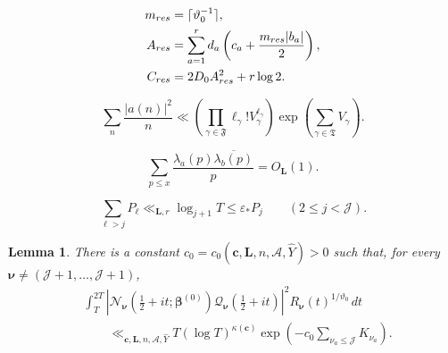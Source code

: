 \documentclass[10pt,a4paper]{amsart}
\newtheorem{lem}{Lemma}
\begin{document}
		\begin{equation}\label{residualMajorantParameters}
			\begin{split}
				m_{\rm res}&=\lceil\vartheta_0^{-1}\rceil,\\
				A_{\rm res}&=\sum_{a=1}^r d_a
				\left(c_a+\frac{m_{\rm res}|b_a|}{2}\right),\\
				C_{\rm res}&=2D_0 A_{\rm res}^2+r\log2 .
			\end{split}
		\end{equation}

			\begin{equation}\label{multiblockCoefficientBound}
				\sum_n\frac{|a(n)|^2}{n}
				\ll
				\left(\prod_{\gamma\in\mathfrak F}
				\ell_\gamma!V_\gamma^{\ell_\gamma}\right)
				\exp\left(\sum_{\gamma\in\mathfrak T}V_\gamma\right).
			\end{equation}

		\begin{equation}\label{crossBlockCovariances}
			\sum_{p\leq x}\frac{\lambda_a(p)\overline{\lambda_b(p)}}p=O_{\boldsymbol L}(1).
		\end{equation}

		\begin{equation}\label{primeBlockHierarchy}
			\sum_{\ell>j}P_\ell\ll_{\boldsymbol L,r}\log_{j+1}T
			\leq\varepsilon_*P_j\qquad(2\leq j<\mathscr J).
		\end{equation}

		\begin{lem}\label{oneOverNResidualMeanLemma}
			There is a constant
			$c_0=c_0(\boldsymbol c,\boldsymbol L,n,\mathscr A, \widehat{Y})>0$ such that, for
			every $\boldsymbol\nu\neq
			(\mathscr J+1,\ldots,\mathscr J+1)$,
			\begin{align}
				&\int_T^{2T}
				|\mathcal N_{\boldsymbol\nu}(\tfrac12+it;
				\boldsymbol\beta^{(0)})
				\mathcal Q_{\boldsymbol\nu}(\tfrac12+it)|^2
				R_{\boldsymbol\nu}(t)^{1/\vartheta_0}\,dt\nonumber\\
				&\qquad\ll_{\boldsymbol c,\boldsymbol L,n,\mathscr A, \widehat{Y}}
				T(\log T)^{\kappa(\boldsymbol c)}
				\exp\left(-c_0
				\sum_{\nu_a\leq\mathscr J}K_{\nu_a}\right).
				\label{oneOverNResidualMeanEstimate}
			\end{align}
		\end{lem}
\end{document}
